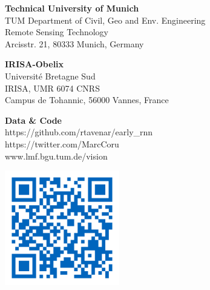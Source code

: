 \documentclass[a0]{tumposter}
\begin{document}
\begin{footer}
	
	\begin{minipage}{.33\textwidth}
		\textbf{Technical University of Munich}\footnotemark[1]\\
		TUM Department of Civil, Geo and Env. Engineering \\
		Remote Sensing Technology \\
		Arcisstr. 21, 80333 Munich, Germany
	\end{minipage}
	\begin{minipage}{.33\textwidth}
		\textbf{IRISA-Obelix}\footnotemark[2]\\
		Université Bretagne Sud \\
		IRISA, UMR 6074 CNRS \\
		Campus de Tohannic, 56000 Vannes, France
		
	\end{minipage}
	\begin{minipage}{.23\textwidth}
		\textbf{Data \& Code} \\
		{https://github.com/rtavenar/early\_rnn} \\
		{https://twitter.com/MarcCoru} \\
		www.lmf.bgu.tum.de/vision
	\end{minipage}
	\begin{minipage}{.10\textwidth}
		\hfill\includegraphics[width=5cm]{images/qr-code}\\
		
	\end{minipage}

	
\end{footer}
\end{document}
